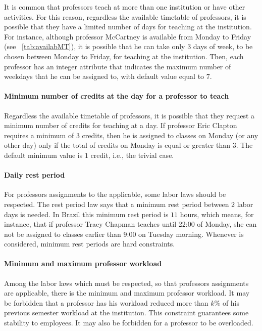 It is common that professors teach at more than one institution or have other activities. For this reason, regardless the available timetable of professors, it is possible that they have a limited number of days for teaching at the institution. For instance, although professor McCartney is available from Monday to Friday (see ~\ref{tab:availabMT}), it is possible that he can take only $3$ days of week, to be chosen between Monday to Friday, for teaching at the institution. Then, each professor has an integer attribute that indicates the maximum number of weekdays that he can be assigned to, with default value equal to $7$.


\paragraph{Minimum number of credits at the day for a professor to teach}
\label{constrmincredsdayprof}

Regardless the available timetable of professors, it is possible that they request a minimum number of credits for teaching at a day. If professor Eric Clapton requires a minimum of $3$ credits, then he is assigned to classes on Monday (or any other day) only if the total of credits on Monday is equal or greater than $3$. The default minimum value is $1$ credit, i.e., the trivial case.


\paragraph{Daily rest period}
\label{constrrestperiod}

For professors assignments to the applicable, some labor laws should be respected. The rest period law says that a minimum rest period between $2$ labor days is needed. In Brazil this minimum rest period is $11$ hours, which means, for instance, that if professor Tracy Chapman teaches until 22:00 of Monday, she can not be assigned to classes earlier than 9:00 on Tuesday morning. Whenever is considered, minimum rest periods are hard constraints.


\paragraph{Minimum and maximum professor workload}
\label{constrminmaxworkload}

Among the labor laws which must be respected, so that professors assignments are applicable, there is the minimum and maximum professor workload. It may be forbidden that a professor has his workload reduced more than $k\%$ of his previous semester workload at the institution. This constraint guarantees some stability to employees. It may also be forbidden for a professor to be overloaded.

